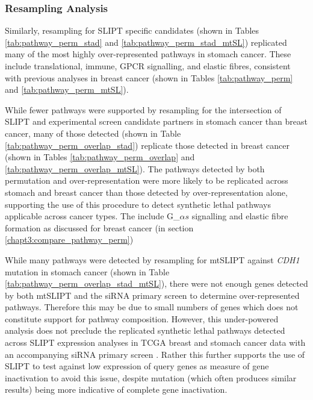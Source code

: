\FloatBarrier

\subsubsection{Resampling Analysis}  \label{chapt3:compare_pathway_perm_stad_SL}

Similarly, resampling for SLIPT specific candidates (shown in Tables \ref{tab:pathway_perm_stad} and \ref{tab:pathway_perm_stad_mtSL}) replicated many of the most highly over-represented pathways in stomach cancer. These include translational, immune, GPCR signalling, and elastic fibres, consistent with previous analyses in breast cancer (shown in Tables \ref{tab:pathway_perm} and \ref{tab:pathway_perm_mtSL}).

While fewer pathways were supported by resampling for the intersection of SLIPT and experimental screen \citep{Telford2015} candidate partners in stomach cancer than breast cancer, many of those detected (shown in Table \ref{tab:pathway_perm_overlap_stad}) replicate those detected in breast cancer (shown in Tables \ref{tab:pathway_perm_overlap} and \ref{tab:pathway_perm_overlap_mtSL}). The pathways detected by both permutation and over-representation were more likely to be replicated across stomach and breast cancer than those detected by over-representation alone, supporting the use of this procedure to detect synthetic lethal pathways applicable across cancer types. The include G_${\alpha s}$ signalling and elastic fibre formation as discussed for breast cancer (in section \ref{chapt3:compare_pathway_perm})

While many pathways were detected by resampling for mtSLIPT against \textit{CDH1} mutation in stomach cancer (shown in Table \ref{tab:pathway_perm_overlap_stad_mtSL}), there were not enough genes detected by both mtSLIPT and the siRNA primary screen to determine over-represented pathways. Therefore this may be due to small numbers of genes which does not constitute support for pathway composition. However, this under-powered analysis does not preclude the replicated synthetic lethal pathways detected across SLIPT expression analyses in TCGA breast and stomach cancer data with an accompanying siRNA primary screen \citep{Telford2015}. Rather this further supports the use of SLIPT to test against low expression of query genes as measure of gene inactivation to avoid this issue, despite mutation (which often produces similar results) being more indicative of complete gene inactivation.

\FloatBarrier

